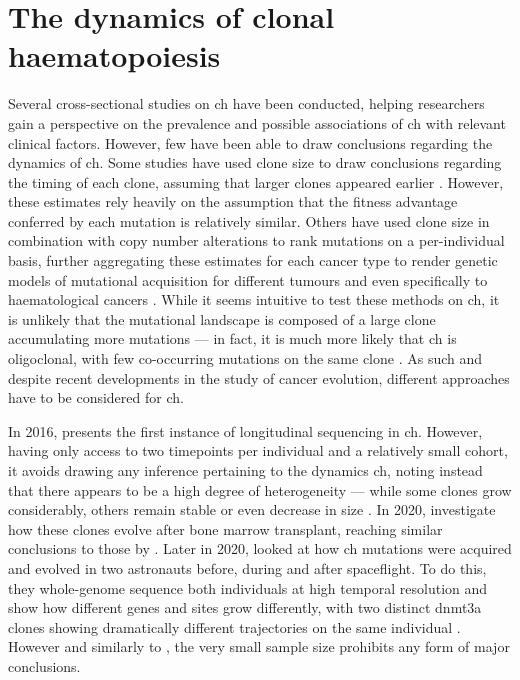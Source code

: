\section{The dynamics of clonal haematopoiesis}

Several cross-sectional studies on \ac{ch} have been conducted, helping researchers gain a perspective on the prevalence and possible associations of \ac{ch} with relevant clinical factors. However, few have been able to draw conclusions regarding the dynamics of \ac{ch}. Some studies have used clone size to draw conclusions regarding the timing of each clone, assuming that larger clones appeared earlier \cite{Li2018-vz}. However, these estimates rely heavily on the assumption that the fitness advantage conferred by each mutation is relatively similar. Others have used clone size in combination with copy number alterations to rank mutations on a per-individual basis, further aggregating these estimates for each cancer type to render genetic models of mutational acquisition for different tumours \cite{Jolly2018-yb,Gerstung2020-kf} and even specifically to haematological cancers \cite{Papaemmanuil2013-yt}. While it seems intuitive to test these methods on \ac{ch}, it is unlikely that the mutational landscape is composed of a large clone accumulating more mutations --- in fact, it is much more likely that \ac{ch} is oligoclonal, with few co-occurring mutations on the same clone \cite{Miles2020-fz,Mitchell2021-zl,Saiki2021-sq}. As such and despite recent developments in the study of cancer evolution, different approaches have to be considered for \ac{ch}.

In 2016,  presents the first instance of longitudinal sequencing in \ac{ch}. However, having only access to two timepoints per individual and a relatively small cohort, it avoids drawing any inference pertaining to the dynamics \ac{ch}, noting instead that there appears to be a high degree of heterogeneity --- while some clones grow considerably, others remain stable or even decrease in size \cite{Young2016-du}. In 2020,  investigate how these clones evolve after bone marrow transplant, reaching similar conclusions to those by  \cite{Suarez-Gonzalez2020-hn}. Later in 2020,  looked at how \ac{ch} mutations were acquired and evolved in two astronauts before, during and after spaceflight. To do this, they whole-genome sequence both individuals at high temporal resolution and show how different genes and sites grow differently, with two distinct \ac{dnmt3a} clones showing dramatically different trajectories on the same individual \cite{Mencia-Trinchant2020-eb}. However and similarly to \cite{Young2016-du}, the very small sample size prohibits any form of major conclusions.

